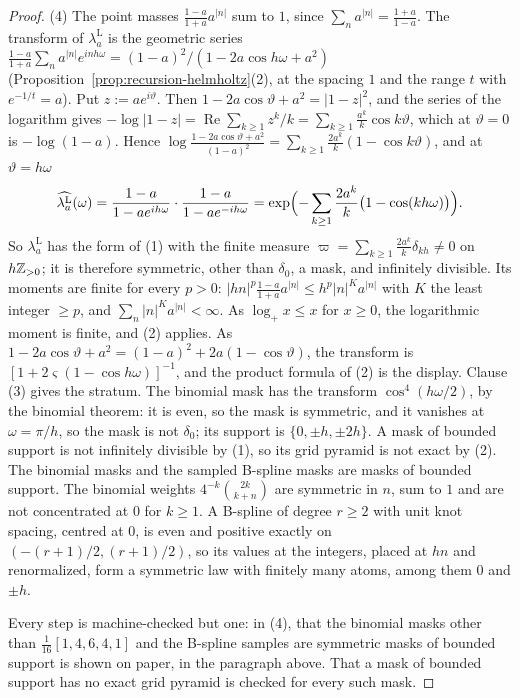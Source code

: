 \begin{proof}
(4) The point masses $\tfrac{1-a}{1+a}a^{|n|}$ sum to $1$, since $\sum_na^{|n|} = \tfrac{1+a}{1-a}$.
The transform of $\lambda^{\mathrm{L}}_a$ is the geometric series
$\tfrac{1-a}{1+a}\sum_na^{|n|}e^{inh\omega} = (1-a)^2/(1 - 2a\cos h\omega + a^2)$
(Proposition~\ref{prop:recursion-helmholtz}(2), at the spacing $1$ and the range $t$ with
$e^{-1/t} = a$). Put $z := ae^{i\vartheta}$. Then $1 - 2a\cos\vartheta + a^2 = |1 - z|^2$, and the
series of the logarithm gives
$-\log|1 - z| = \operatorname{Re}\sum_{k \ge 1}z^k/k = \sum_{k \ge 1}\tfrac{a^k}{k}\cos k\vartheta$,
which at $\vartheta = 0$ is $-\log(1 - a)$. Hence
$\log\tfrac{1 - 2a\cos\vartheta + a^2}{(1-a)^2} = \sum_{k \ge 1}\tfrac{2a^k}{k}(1 - \cos k\vartheta)$,
and at $\vartheta = h\omega$
\[
  \widehat{\lambda^{\mathrm{L}}_a}(\omega) = \frac{1-a}{1 - ae^{ih\omega}}\cdot\frac{1-a}{1 - ae^{-ih\omega}}
  = \exp\Bigl(-\sum_{k \ge 1}\frac{2a^k}{k}\bigl(1 - \cos(kh\omega)\bigr)\Bigr) .
\]
So $\lambda^{\mathrm{L}}_a$ has the form of (1) with the finite measure
$\varpi = \sum_{k \ge 1}\tfrac{2a^k}{k}\delta_{kh} \ne 0$ on $h\mathbb{Z}_{>0}$; it is therefore symmetric,
other than $\delta_0$, a mask, and infinitely divisible. Its moments are finite for every $p > 0$:
$|hn|^p\tfrac{1-a}{1+a}a^{|n|} \le h^p|n|^Ka^{|n|}$ with $K$ the least integer $\ge p$, and
$\sum_n|n|^Ka^{|n|} < \infty$. As $\log_+x \le x$ for $x \ge 0$, the logarithmic moment is finite,
and (2) applies. As $1 - 2a\cos\vartheta + a^2 = (1-a)^2 + 2a(1 - \cos\vartheta)$, the transform is
$[1 + 2\varsigma(1 - \cos h\omega)]^{-1}$, and the product formula of (2) is the display. Clause
(3) gives the stratum. The binomial mask has the transform $\cos^4(h\omega/2)$, by the binomial
theorem: it is even, so the mask is symmetric, and it vanishes at $\omega = \pi/h$, so the mask is
not $\delta_0$; its support is $\{0, \pm h, \pm2h\}$. A mask of bounded support is not infinitely
divisible by (1), so its grid pyramid is not exact by (2). The binomial masks and the sampled B-spline masks
are masks of bounded support. The binomial weights $4^{-k}\binom{2k}{k+n}$ are symmetric in
$n$, sum to $1$ and are not concentrated at $0$ for $k \ge 1$. A B-spline of degree $r \ge 2$
with unit knot spacing, centred at $0$, is even and positive exactly on $(-(r+1)/2, (r+1)/2)$, so its
values at the integers, placed at $hn$ and renormalized, form a symmetric law with finitely many
atoms, among them $0$ and $\pm h$.

Every step is machine-checked but one: in (4), that the binomial masks other than
$\tfrac1{16}[1,4,6,4,1]$ and the B-spline samples are symmetric masks of bounded support is shown on
paper, in the paragraph above. That a mask of bounded support has no exact grid pyramid is checked
for every such mask.
\end{proof}

